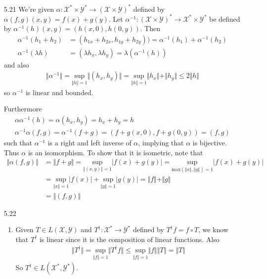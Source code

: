 \documentclass[11pt,letter]{article}
\begin{document}
\begin{enumerate}
    \item [5.21] We're given $\alpha: \mathcal{X}^* \times \mathcal{Y}^* \rightarrow (\mathcal{X} \times \mathcal{Y})^*$ defined by $\alpha(f,g)(x,y) = f(x) + g(y)$. Let $\alpha^{-1}: (\mathcal{X} \times \mathcal{Y})^* \rightarrow \mathcal{X}^* \times \mathcal{Y}^*$ be defined by $\alpha^{-1}(h)(x,y) = (h(x,0),h(0,y))$. Then 
    \begin{align*}
        \alpha^{-1}(h_1 + h_2) & = (h_{1x}+h_{2x},h_{1y}+h_{2y})) = \alpha^{-1}(h_1) + \alpha^{-1}(h_2)\\
        \alpha^{-1}(\lambda h) & = (\lambda h_x, \lambda h_y) = \lambda(\alpha^{-1}(h))
    \end{align*}
    and also
    \begin{align*}
        \Vert \alpha^{-1} \Vert  = \underset{\Vert h \Vert = 1}{\text{sup}} \Vert (h_x,h_y) \Vert = \underset{\Vert h \Vert = 1}{\text{sup}} \Vert h_x \Vert + \Vert h_y \Vert \le 2 \Vert h \Vert
    \end{align*}
    so $\alpha^{-1}$ is linear and bounded.

    Furthermore
    \begin{align*}
        \alpha \alpha^{-1} (h) = \alpha(h_x,h_y) = h_x + h_y = h \\
        \alpha^{-1} \alpha (f,g) = \alpha^{-1}(f+g) = (f+g(x,0),f+g(0,y)) = (f,g)
    \end{align*}
    such that $\alpha^{-1}$ is a right and left inverse of $\alpha$, implying that $\alpha$ is bijective. Thus $\alpha$ is an isomorphism. To show that it is isometric, note that
    \begin{align*}
        \Vert \alpha(f,g) \Vert & = \Vert f + g \Vert = \underset{\Vert (x,y) \Vert = 1}{\text{sup}} \vert f(x)+g(y) \vert = \underset{\text{max}(\Vert x \Vert, \Vert y \Vert) = 1}{\text{sup}} \vert f(x)+g(y) \vert \\ & = \underset{\Vert x \Vert = 1}{\text{sup}} \vert f(x) \vert + \underset{\Vert y \Vert = 1}{\text{sup}} \vert g(y) \vert = \Vert f \Vert + \Vert g \Vert \\ & = \Vert (f,g) \Vert
    \end{align*}

    \item [5.22] \begin{enumerate}
        \item Given $T \in L(\mathcal{X}, \mathcal{Y})$ and $T^\dagger: \mathcal{X}^* \rightarrow \mathcal{Y}^*$ defined by $T^\dagger f = f \circ T$, we know that $T^\dagger$ is linear since it is the composition of linear functions. Also
        \begin{align*}
            \Vert T^\dagger \Vert = \underset{\Vert f \Vert = 1}{\text{sup}}\Vert T^\dagger f \Vert \le \underset{\Vert f \Vert = 1}{\text{sup}} \Vert f \Vert \Vert T \Vert = \Vert T \Vert
        \end{align*}
        So $T^\dagger \in L(\mathcal{X}^*, \mathcal{Y}^*)$. 


\end{enumerate}
\end{enumerate}
\end{document}

